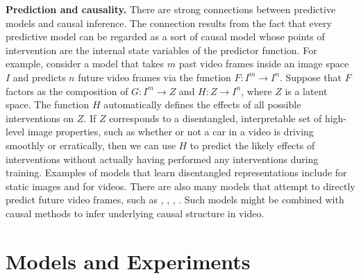 \documentclass{article}
\begin{document}
\textbf{Prediction and causality.} There are strong connections between predictive models and causal inference. The connection results from the fact that every predictive model can be regarded as a sort of causal model whose points of intervention are the internal state variables of the predictor function. For example, consider a model that takes $m$ past video frames inside an image space $I$ and predicts $n$ future video frames via the function $F: I^m \rightarrow I^n$. Suppose that $F$ factors as the composition of $G: I^m \rightarrow Z$ and $H: Z \rightarrow I^n$, where $Z$ is a latent space. The function $H$ automatically defines the effects of all possible interventions on $Z$. If $Z$ corresponds to a disentangled, interpretable set of high-level image properties, such as whether or not a car in a video is driving smoothly or erratically, then we can use $H$ to predict the likely effects of interventions without actually having performed any interventions during training. Examples of models that learn disentangled representations include \cite{chen2016infogan} for static images and \cite{denton2017unsupervised} for videos. There are also many models that attempt to directly predict future video frames, such as \cite{Babaeizadeh2017}, \cite{Lotter2016}, \cite{Finn2016}, \cite{Walker2014}. Such models might be combined with causal methods to infer underlying causal structure in video.




















\section{Models and Experiments}
\end{document}
